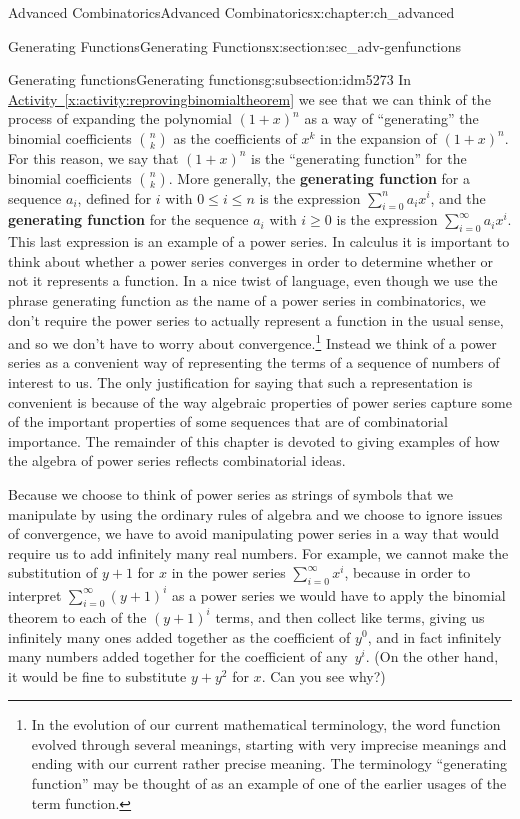 \documentclass[oneside,10pt,]{book}
\newcommand{\terminology}[1]{\textbf{#1}}
\numberwithin{equation}{chapter}
\begin{document}
\begin{chapterptx}{Advanced Combinatorics}{}{Advanced Combinatorics}{}{}{x:chapter:ch_advanced}
\begin{sectionptx}{Generating Functions}{}{Generating Functions}{}{}{x:section:sec_adv-genfunctions}
\begin{subsectionptx}{Generating functions}{}{Generating functions}{}{}{g:subsection:idm5273}
In \hyperref[x:activity:reprovingbinomialtheorem]{Activity~\ref{x:activity:reprovingbinomialtheorem}} we see that we can think of the process of expanding the polynomial \((1+x)^n\) as a way of ``generating'' the binomial coefficients \(\binom{n}{k}\) as the coefficients of \(x^k\) in the expansion of \((1+x)^n\). For this reason, we say that \((1+x)^n\) is the ``generating function'' for the binomial coefficients \(\binom{n}{k}\). More generally, the \terminology{generating function} for a sequence \(a_i\), defined for \(i\) with \(0\le i\le n\) is the expression \(\sum_{i=0}^n a_ix^i\), and the \terminology{generating function} for the sequence \(a_i\) with \(i\ge 0\) is the expression \(\sum_{i=0}^\infty a_ix^i\). This last expression is an example of a power series. In calculus it is important to think about whether a power series converges in order to determine whether or not it represents a function. In a nice twist of language, even though we use the phrase generating function as the name of a power series in combinatorics, we don't require the power series to actually represent a function in the usual sense, and so we don't have to worry about convergence.\footnote{In the evolution of our current mathematical terminology, the word function evolved through several meanings, starting with very imprecise meanings and ending with our current rather precise meaning.  The terminology ``generating function'' may be thought of as an example of one of the earlier usages of the term function.\label{g:fn:idm5392}} Instead we think of a power series as a convenient way of representing the terms of a sequence of numbers of interest to us. The only justification for saying that such a representation is convenient is because of the way algebraic properties of power series capture some of the important properties of some sequences that are of combinatorial importance. The remainder of this chapter is devoted to giving examples of how the algebra of power series reflects combinatorial ideas.%
\par
Because we choose to think of power series as strings of symbols that we manipulate by using the ordinary rules of algebra and we choose to ignore issues of convergence, we have to avoid manipulating power series in a way that would require us to add infinitely many real numbers. For example, we cannot make the substitution of \(y+1\) for \(x\) in the power series \(\sum_{i=0}^\infty x^i\), because in order to interpret \(\sum_{i=0}^\infty (y+1)^i\) as a power series we would have to apply the binomial theorem to each of the \((y+1)^i\) terms, and then collect like terms, giving us infinitely many ones added together as the coefficient of \(y^0\), and in fact infinitely many numbers added together for the coefficient of any~\(y^i\). (On the other hand, it would be fine to substitute \(y+y^2\) for \(x\). Can you see why?)%

\end{subsectionptx}
\end{sectionptx}
\end{chapterptx}
\end{document}
